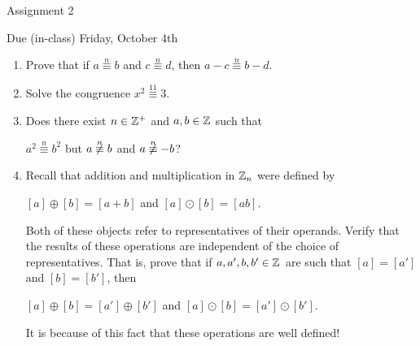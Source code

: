 \documentclass[11pt,fleqn,dvipsnames,usenames]{article}
\renewcommand{\headrulewidth}{1pt}
\newcommand{\p}{\noindent}
\begin{document}
\fancyhead[L]{\course}
\fancyhead[R]{\term}
\renewcommand{\headrulewidth}{0.4pt}

\begin{center}
{\huge Assignment 2}
\vsp

{\large Due (in-class) Friday, October 4th}
\end{center}

\begin{enumerate}
\item Prove that if $a\overset{n}{\equiv}b$ and $c\overset{n}{\equiv}d$, then $a-c\overset{n}{\equiv}b-d$.
\item Solve the congruence $x^2\overset{11}{\equiv}3$.
\item Does there exist $n\in\mathbb{Z}^{+}$ and $a,b\in\mathbb{Z}$ such that
\begin{center}
$a^2\overset{n}{\equiv}b^2$ but $a\not\overset{n}{\equiv}b$ and $a\not\overset{n}{\equiv}-b$?
\end{center}
\item Recall that addition and multiplication in $\mathbb{Z}_n$ were defined by
\begin{center}
$[a] \oplus [b] = [a + b]$ and $[a]\odot [b] = [ab]$.
\end{center}
\p Both of these objects refer to representatives of their operands.  Verify that the results of these operations are independent of the choice of representatives.  That is, prove that if $a,a',b,b'\in\mathbb{Z}$ are such that $[a] = [a']$ and $[b] = [b']$, then
\begin{center}
$[a]\oplus [b] = [a']\oplus [b']$ and $[a]\odot [b] = [a']\odot [b']$.
\end{center}

\note It is because of this fact that these operations are well defined!




\end{enumerate}
\end{document}
